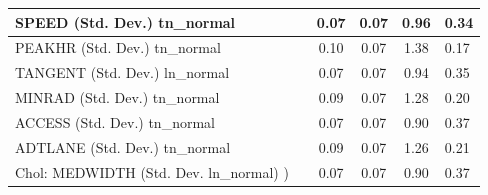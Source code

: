 \begin{table}
\begin{center}
\begin{tabular}{|l|l|c|c|c|l|}
			\hline
			SPEED (Std. Dev.) tn_normal &  & 0.07 & 0.07 & 0.96 & 0.34 \\
			\hline
			PEAKHR (Std. Dev.) tn_normal &  & 0.10 & 0.07 & 1.38 & 0.17 \\
			\hline
			TANGENT (Std. Dev.) ln_normal &  & 0.07 & 0.07 & 0.94 & 0.35 \\
			\hline
			MINRAD (Std. Dev.) tn_normal &  & 0.09 & 0.07 & 1.28 & 0.20 \\
			\hline
			ACCESS (Std. Dev.) tn_normal &  & 0.07 & 0.07 & 0.90 & 0.37 \\
			\hline
			ADTLANE (Std. Dev.) tn_normal &  & 0.09 & 0.07 & 1.26 & 0.21 \\
			\hline
			 Chol: MEDWIDTH (Std. Dev. ln_normal) ) &  & 0.07 & 0.07 & 0.90 & 0.37 \\
			\hline
		\end{tabular}
	\end{center}
\end{table}